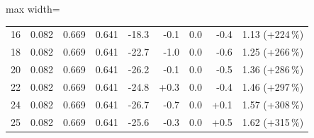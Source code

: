 \begin{table}[htbp]
\begin{adjustbox}{max width=\textwidth}
\begin{tabular}{r rrr rrrr r}
        16 & 0.082 & 0.669 & 0.641 & -18.3 & -0.1 & 0.0 & -0.4 & 1.13 (+224\,\%) \\
        18 & 0.082 & 0.669 & 0.641 & -22.7 & -1.0 & 0.0 & -0.6 & 1.25 (+266\,\%) \\
        20 & 0.082 & 0.669 & 0.641 & -26.2 & -0.1 & 0.0 & -0.5 & 1.36 (+286\,\%) \\
        22 & 0.082 & 0.669 & 0.641 & -24.8 & +0.3 & 0.0 & -0.4 & 1.46 (+297\,\%) \\
        24 & 0.082 & 0.669 & 0.641 & -26.7 & -0.7 & 0.0 & +0.1 & 1.57 (+308\,\%) \\
        25 & 0.082 & 0.669 & 0.641 & -25.6 & -0.3 & 0.0 & +0.5 & 1.62 (+315\,\%) \\
        \bottomrule
    \end{tabular}
    \end{adjustbox}
\end{table}
